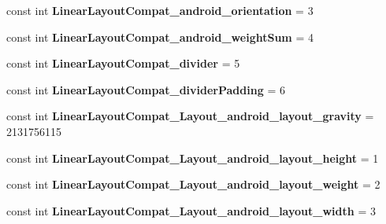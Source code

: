 \begin{DoxyCompactItemize}
\item 
\mbox{\label{classst_delivery_1_1_resource_1_1_styleable_a621896c01346f0f68425217be338fa76}} 
const int {\bfseries Linear\+Layout\+Compat\+\_\+android\+\_\+orientation} = 3
\item 
\mbox{\label{classst_delivery_1_1_resource_1_1_styleable_a0ccb656e84e3cc08c71eb6f6dfbe8339}} 
const int {\bfseries Linear\+Layout\+Compat\+\_\+android\+\_\+weight\+Sum} = 4
\item 
\mbox{\label{classst_delivery_1_1_resource_1_1_styleable_abcfee0a409fb228e36b844dd8269be5c}} 
const int {\bfseries Linear\+Layout\+Compat\+\_\+divider} = 5
\item 
\mbox{\label{classst_delivery_1_1_resource_1_1_styleable_a14c2937355f48a55fbe15059eb765b37}} 
const int {\bfseries Linear\+Layout\+Compat\+\_\+divider\+Padding} = 6
\item 
\mbox{\label{classst_delivery_1_1_resource_1_1_styleable_a5e181b485fe5775f9a098ffc28bf59d1}} 
const int {\bfseries Linear\+Layout\+Compat\+\_\+\+Layout\+\_\+android\+\_\+layout\+\_\+gravity} = 2131756115
\item 
\mbox{\label{classst_delivery_1_1_resource_1_1_styleable_aa8738ba05c0a01f5217aa202a6ec7bd6}} 
const int {\bfseries Linear\+Layout\+Compat\+\_\+\+Layout\+\_\+android\+\_\+layout\+\_\+height} = 1
\item 
\mbox{\label{classst_delivery_1_1_resource_1_1_styleable_adbb14702be81ae6e0f1fd7f49aab917d}} 
const int {\bfseries Linear\+Layout\+Compat\+\_\+\+Layout\+\_\+android\+\_\+layout\+\_\+weight} = 2
\item 
\mbox{\label{classst_delivery_1_1_resource_1_1_styleable_a1a142e6d5cf6cc2cd870698b4e5f674a}} 
const int {\bfseries Linear\+Layout\+Compat\+\_\+\+Layout\+\_\+android\+\_\+layout\+\_\+width} = 3
\item 

\end{DoxyCompactItemize}
